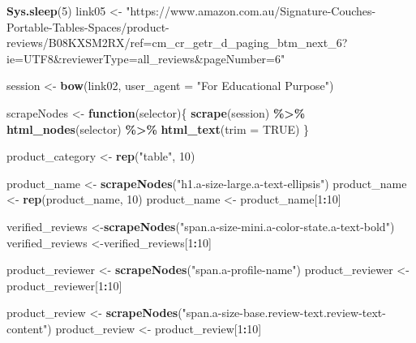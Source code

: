 \documentclass[
]{article}
\newenvironment{Shaded}{\begin{snugshade}}{\end{snugshade}}
\newcommand{\AttributeTok}[1]{\textcolor[rgb]{0.13,0.29,0.53}{#1}}
\newcommand{\ConstantTok}[1]{\textcolor[rgb]{0.56,0.35,0.01}{#1}}
\newcommand{\ControlFlowTok}[1]{\textcolor[rgb]{0.13,0.29,0.53}{\textbf{#1}}}
\newcommand{\DecValTok}[1]{\textcolor[rgb]{0.00,0.00,0.81}{#1}}
\newcommand{\FunctionTok}[1]{\textcolor[rgb]{0.13,0.29,0.53}{\textbf{#1}}}
\newcommand{\NormalTok}[1]{#1}
\newcommand{\OtherTok}[1]{\textcolor[rgb]{0.56,0.35,0.01}{#1}}
\newcommand{\SpecialCharTok}[1]{\textcolor[rgb]{0.81,0.36,0.00}{\textbf{#1}}}
\newcommand{\StringTok}[1]{\textcolor[rgb]{0.31,0.60,0.02}{#1}}
\begin{document}
\begin{Shaded}
\begin{Highlighting}[]
   \FunctionTok{Sys.sleep}\NormalTok{(}\DecValTok{5}\NormalTok{)}
\NormalTok{link05 }\OtherTok{\textless{}{-}} \StringTok{"https://www.amazon.com.au/Signature{-}Couches{-}Portable{-}Tables{-}Spaces/product{-}reviews/B08KXSM2RX/ref=cm\_cr\_getr\_d\_paging\_btm\_next\_6?ie=UTF8\&reviewerType=all\_reviews\&pageNumber=6"}


\NormalTok{  session }\OtherTok{\textless{}{-}} \FunctionTok{bow}\NormalTok{(link02,}
               \AttributeTok{user\_agent =} \StringTok{"For Educational Purpose"}\NormalTok{)}

\NormalTok{  scrapeNodes }\OtherTok{\textless{}{-}} \ControlFlowTok{function}\NormalTok{(selector)\{}
    \FunctionTok{scrape}\NormalTok{(session) }\SpecialCharTok{\%\textgreater{}\%}
      \FunctionTok{html\_nodes}\NormalTok{(selector) }\SpecialCharTok{\%\textgreater{}\%}
      \FunctionTok{html\_text}\NormalTok{(}\AttributeTok{trim =} \ConstantTok{TRUE}\NormalTok{)}
\NormalTok{  \}}

\NormalTok{  product\_category }\OtherTok{\textless{}{-}} \FunctionTok{rep}\NormalTok{(}\StringTok{"table"}\NormalTok{, }\DecValTok{10}\NormalTok{)}

\NormalTok{  product\_name }\OtherTok{\textless{}{-}} \FunctionTok{scrapeNodes}\NormalTok{(}\StringTok{"h1.a{-}size{-}large.a{-}text{-}ellipsis"}\NormalTok{)}
\NormalTok{  product\_name }\OtherTok{\textless{}{-}} \FunctionTok{rep}\NormalTok{(product\_name, }\DecValTok{10}\NormalTok{)}
\NormalTok{  product\_name }\OtherTok{\textless{}{-}}\NormalTok{ product\_name[}\DecValTok{1}\SpecialCharTok{:}\DecValTok{10}\NormalTok{]}
  
\NormalTok{  verified\_reviews }\OtherTok{\textless{}{-}}\FunctionTok{scrapeNodes}\NormalTok{(}\StringTok{"span.a{-}size{-}mini.a{-}color{-}state.a{-}text{-}bold"}\NormalTok{)}
\NormalTok{  verified\_reviews }\OtherTok{\textless{}{-}}\NormalTok{verified\_reviews[}\DecValTok{1}\SpecialCharTok{:}\DecValTok{10}\NormalTok{]}
  
\NormalTok{  product\_reviewer }\OtherTok{\textless{}{-}} \FunctionTok{scrapeNodes}\NormalTok{(}\StringTok{"span.a{-}profile{-}name"}\NormalTok{)}
\NormalTok{  product\_reviewer }\OtherTok{\textless{}{-}}\NormalTok{ product\_reviewer[}\DecValTok{1}\SpecialCharTok{:}\DecValTok{10}\NormalTok{]}
  
\NormalTok{  product\_review }\OtherTok{\textless{}{-}} \FunctionTok{scrapeNodes}\NormalTok{(}\StringTok{"span.a{-}size{-}base.review{-}text.review{-}text{-}content"}\NormalTok{)}
\NormalTok{  product\_review }\OtherTok{\textless{}{-}}\NormalTok{ product\_review[}\DecValTok{1}\SpecialCharTok{:}\DecValTok{10}\NormalTok{]}
  

\end{Highlighting}
\end{Shaded}
\end{document}

